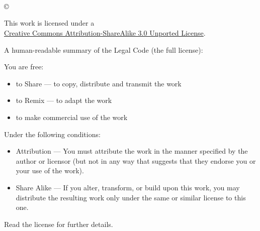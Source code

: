 \thispagestyle{plain}
\begin{titlepage}

\begin{center}

\huge{\textbf{\titel}}\\[1.5ex]
\LARGE{\textbf{\untertitel}}\\[6ex]

\normalsize
\autor\\[1.2ex]
\copyright\ \jahr\\[9ex]

\end{center}

\singlespacing
\small
\noindent 
\begin{center}
This work is licensed under a \\ \hyperlink{http://creativecommons.org/licenses/by-sa/3.0/}{Creative Commons Attribution-ShareAlike 3.0 Unported License}.
\end{center}

A human-readable summary of the Legal Code (the full license):

You are free:
\begin{itemize}
\item to Share — to copy, distribute and transmit the work
\item to Remix — to adapt the work
\item to make commercial use of the work
\end{itemize}

Under the following conditions:
\begin{itemize}
\item Attribution — You must attribute the work in the manner specified by the author or licensor (but not in any way that suggests that they endorse you or your use of the work).
\item Share Alike — If you alter, transform, or build upon this work, you may distribute the resulting work only under the same or similar license to this one.
\end{itemize}

Read the license for further details.

\end{titlepage}
